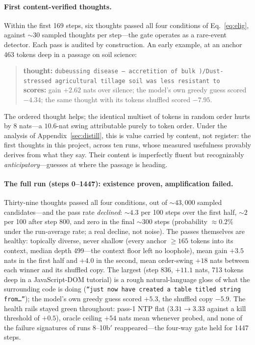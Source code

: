 \documentclass{article} %
\begin{document}
\paragraph{First content-verified thoughts.} Within the first 169 steps, six thoughts passed all four conditions of Eq.~\eqref{eq:elig}, against ${\sim}30$ sampled thoughts per step---the gate operates as a rare-event detector. Each pass is audited by construction. An early example, at an anchor 463 tokens deep in a passage on soil science:
\begin{quote}\small
\textbf{thought:} \texttt{dubeussing disease -- accretition of bulk )\;/\;Dust-stressed agricultural tillage soil was less resistant to} \\
\textbf{scores:} gain $+2.62$ nats over silence; the model's own greedy guess scored $-4.34$; the same thought with its tokens shuffled scored $-7.95$.
\end{quote}
The ordered thought helps; the identical multiset of tokens in random order hurts by $8$ nats---a $10.6$-nat swing attributable purely to token order. Under the analysis of Appendix~\ref{sec:distill}, this is value carried by content, not register: the first thoughts in this project, across ten runs, whose measured usefulness provably derives from what they say. Their content is imperfectly fluent but recognizably \emph{anticipatory}---guesses at where the passage is heading.

\paragraph{The full run (steps 0--1447): existence proven, amplification failed.} Thirty-nine thoughts passed all four conditions, out of ${\sim}43{,}000$ sampled candidates---and the pass rate \emph{declined}: ${\sim}4.3$ per 100 steps over the first half, ${\sim}2$ per 100 after step 800, and zero in the final ${\sim}300$ steps (probability ${\approx}0.2\%$ under the run-average rate; a real decline, not noise). The passes themselves are healthy: topically diverse, never shallow (every anchor ${\ge}165$ tokens into its context, median depth 499---the context floor left no loophole), mean gain $+3.5$ nats in the first half and $+4.0$ in the second, mean order-swing $+18$ nats between each winner and its shuffled copy. The largest (step 836, $+11.1$ nats, 713 tokens deep in a JavaScript-DOM tutorial) is a rough natural-language gloss of what the surrounding code is doing (\texttt{``just now have created a table titled string from\ldots''}); the model's own greedy guess scored $+5.3$, the shuffled copy $-5.9$. The health rails stayed green throughout: pass-1 NTP flat ($3.31 \to 3.33$ against a kill threshold of $+0.5$), oracle ceiling $+54$ nats mean whenever probed, and none of the failure signatures of runs 8--10b$'$ reappeared---the four-way gate held for 1447 steps.
\end{document}
